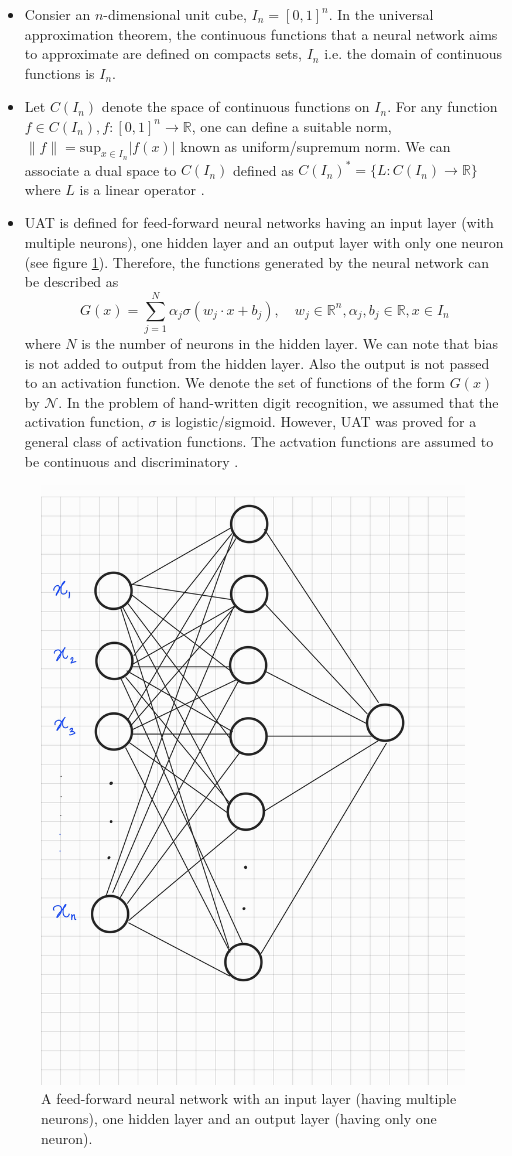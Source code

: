 \begin{itemize}
    \item Consier an $n$-dimensional unit cube, $I_n = [0,1]^n$. In the universal approximation theorem, the continuous
    functions that a neural network aims to approximate are defined on compacts sets, $I_n$ i.e. the domain of continuous
    functions is $I_n$. 
    \item Let $C(I_n)$ denote the space of continuous functions on $I_n$.
    For any function $f \in C(I_n), f : [0,1]^n \rightarrow \mathbb{R}$, one can define a suitable norm, 
    $\|f\| = \text{sup}_{x \in I_n} |f(x)|$ known as uniform/supremum norm. We can associate a dual space to $C(I_n)$ 
    defined as $C(I_n)^* = \{L : C(I_n) \rightarrow \mathbb{R}\}$ where $L$ is a linear operator \cite{kreyszig1991introductory}.
    \item UAT is defined for feed-forward neural networks having an input layer (with multiple neurons), one hidden layer and
    an output layer with only one neuron (see figure \ref{fig:ffnn_UAT}). Therefore, the functions generated by the neural network can be described as
    $$G(x) = \sum_{j=1}^{N} \alpha_j \sigma (w_j\cdot x + b_j), \quad w_j \in \mathbb{R}^n, \alpha_j, b_j \in \mathbb{R}, x \in I_n$$
    where $N$ is the number of neurons in the hidden layer. We can note that bias is not added to output from the hidden
    layer. Also the output is not passed to an activation function. We denote the set of functions of the form $G(x)$
    by $\mathcal{N}$. In the problem of hand-written digit recognition, we assumed that the activation function, $\sigma$ is logistic/sigmoid. 
    However, UAT was proved for a general class of activation functions. The actvation functions are assumed to be continuous and 
    discriminatory \cite{cybenko1989approximation}. 
\end{itemize} 
\begin{figure}[htbp]
    \centering
    \includegraphics[width=.4\textwidth]{Figures/ffnn_UAT.jpg}
    \caption{A feed-forward neural network with an input layer (having multiple neurons), one hidden layer and an output layer (having only one neuron).}
    \label{fig:ffnn_UAT}
\end{figure}
